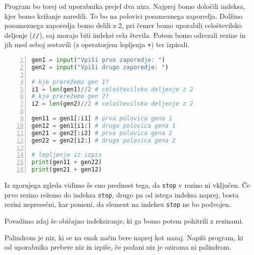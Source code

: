 \begin{resitev}
Program bo torej od uporabnika prejel dva niza. Najprej bomo določili indeksa, kjer bomo križanje naredili. To bo na polovici posameznega zaporedja. Dolžino posameznega zaporedja bomo delili z 2, pri čemer bomo uporabili celoštevilsko deljenje (\texttt{//}), saj morajo biti indeksi cela števila. Potem bomo odrezali rezine in jih med seboj sestavili (z operatorjem lepljenja \texttt{+}) ter izpisali.
\begin{lstlisting}[language=Python,numbers=left]
gen1 = input("Vpiši prvo zaporedje: ")
gen2 = input("Vpiši drugo zaporedje: ")

# kje prerežemo gen 1?
i1 = len(gen1)//2 # celoštevilsko deljenje z 2
# kje prerežemo gen 2?
i2 = len(gen2)//2 # celoštevilsko deljenje z 2

gen11 = gen1[:i1] # prva polovica gena 1
gen12 = gen1[i1:] # druga polovica gena 1
gen21 = gen2[:i2] # prva polovica gena 2
gen22 = gen2[i2:] # druga polovica gena 2

# lepljenje iz izpis
print(gen11 + gen22) 
print(gen21 + gen12)
\end{lstlisting}
\end{resitev}
Iz zgornjega zgleda vidimo še eno prednost tega, da \texttt{stop} v rezino ni vključen. Če prvo rezino režemo do indeksa \texttt{stop}, drugo pa od istega indeksa naprej, bosta rezini nepresečni, kar pomeni, da element na indeksu \texttt{stop} ne bo podvojen.

Povadimo zdaj še običajno indeksiranje, ki ga bomo potem pohitrili z rezinami.

\begin{zgled}
Palindrom je niz, ki se na enak način bere naprej kot nazaj. Napiši program, ki od uporabnika prebere niz in izpiše, če podani niz je oziroma ni palindrom.
\end{zgled}

